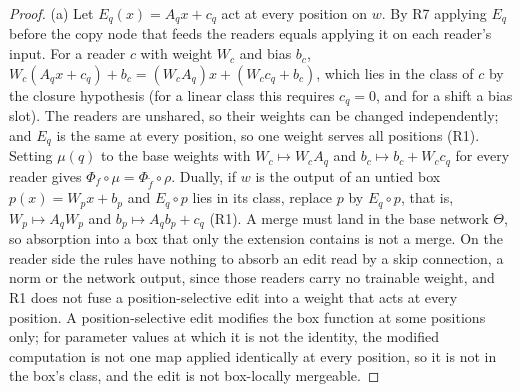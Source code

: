 \begin{proof}
(a) Let $E_q(x)=A_qx+c_q$ act at every position on $w$. By R7 applying $E_q$ before the copy node that feeds the readers
equals applying it on each reader's input. For a reader $c$ with weight $W_c$ and bias $b_c$,
$W_c(A_qx+c_q)+b_c=(W_cA_q)x+(W_cc_q+b_c)$, which lies in the class of $c$ by the closure hypothesis (for a linear class this
requires $c_q=0$, and for a shift a bias slot). The readers are unshared, so their weights can be changed independently; and
$E_q$ is the same at every position, so one weight serves all positions (R1). Setting $\mu(q)$ to the base weights with
$W_c\mapsto W_cA_q$ and $b_c\mapsto b_c+W_cc_q$ for every reader gives $\Phi_f\circ\mu=\Phi_{\tilde f}\circ\rho$. Dually, if
$w$ is the output of an untied box $p(x)=W_px+b_p$ and $E_q\circ p$ lies in its class, replace $p$ by $E_q\circ p$, that is,
$W_p\mapsto A_qW_p$ and $b_p\mapsto A_qb_p+c_q$ (R1). A merge must land in the base network $\Theta$, so absorption into a box
that only the extension contains is not a merge. On the reader side the rules have nothing to absorb an edit read by a skip
connection, a norm or the network output, since those readers carry no trainable weight, and R1 does not fuse a
position-selective edit into a weight that acts at every position. A position-selective edit modifies the box function at
some positions only; for parameter values at which it is not the identity, the modified computation is not one map applied
identically at every position, so it is not in the box's class, and the edit is not box-locally mergeable.


\end{proof}

